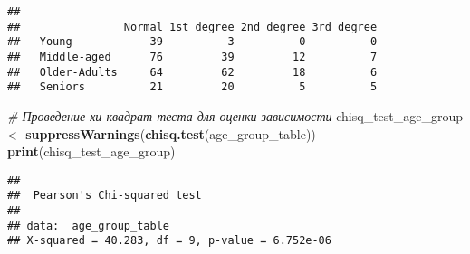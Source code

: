 \documentclass[
]{article}
\newenvironment{Shaded}{\begin{snugshade}}{\end{snugshade}}
\newcommand{\CommentTok}[1]{\textcolor[rgb]{0.56,0.35,0.01}{\textit{#1}}}
\newcommand{\FunctionTok}[1]{\textcolor[rgb]{0.13,0.29,0.53}{\textbf{#1}}}
\newcommand{\NormalTok}[1]{#1}
\newcommand{\OtherTok}[1]{\textcolor[rgb]{0.56,0.35,0.01}{#1}}
\begin{document}
\begin{verbatim}
##               
##                Normal 1st degree 2nd degree 3rd degree
##   Young            39          3          0          0
##   Middle-aged      76         39         12          7
##   Older-Adults     64         62         18          6
##   Seniors          21         20          5          5
\end{verbatim}

\begin{Shaded}
\begin{Highlighting}[]
\CommentTok{\# Проведение хи{-}квадрат теста для оценки зависимости}
\NormalTok{chisq\_test\_age\_group }\OtherTok{\textless{}{-}} \FunctionTok{suppressWarnings}\NormalTok{(}\FunctionTok{chisq.test}\NormalTok{(age\_group\_table))}
\FunctionTok{print}\NormalTok{(chisq\_test\_age\_group)}
\end{Highlighting}
\end{Shaded}

\begin{verbatim}
## 
##  Pearson's Chi-squared test
## 
## data:  age_group_table
## X-squared = 40.283, df = 9, p-value = 6.752e-06
\end{verbatim}
\end{document}
